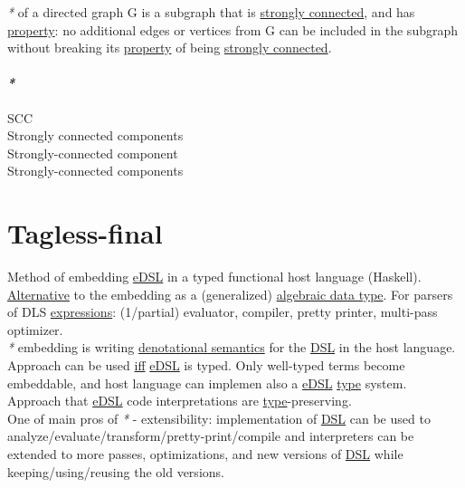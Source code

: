 \documentclass[a4paper,14pt,oneside]{book}
\begin{document}
{\emph{*} of a directed graph G is a subgraph that is \hyperref[orgb705c55]{strongly connected}, and has \hyperref[org2731790]{property}: no additional edges or vertices from G can be included in the subgraph without breaking its \hyperref[org2731790]{property} of being \hyperref[orgb705c55]{strongly connected}.\\

\subsubsection{\emph{*}}
\label{sec:org981028e}

\label{org488e326}SCC\\
\label{org6450785}Strongly connected components\\
\label{orgc65c34e}Strongly-connected component\\
\label{org1a762a6}Strongly-connected components\\

\chapter{\label{orgfb6cfdd}Tagless-final}
\label{sec:org8ffef3c}
Method of embedding \hyperref[org355da77]{eDSL} in a typed functional host language (Haskell). \hyperref[org4703b00]{Alternative} to the embedding as a (generalized) \hyperref[org1ceda42]{algebraic data type}. For parsers of DLS \hyperref[org6328353]{expressions}: (1/partial) evaluator, compiler, pretty printer, multi-pass optimizer.\\

\emph{*} embedding is writing \hyperref[org484295a]{denotational semantics} for the \hyperref[org6c3d96a]{DSL} in the host language.\\

Approach can be used \hyperref[org514b01f]{iff} \hyperref[org355da77]{eDSL} is typed. Only well-typed terms become embeddable, and host language can implemen also a \hyperref[org355da77]{eDSL} \hyperref[orga9ca243]{type} system. Approach that \hyperref[org355da77]{eDSL} code interpretations are \hyperref[orga9ca243]{type}-preserving.\\

One of main pros of \emph{*} - extensibility: implementation of \hyperref[org6c3d96a]{DSL} can be used to analyze/evaluate/transform/pretty-print/compile and interpreters can be extended to more passes, optimizations, and new versions of \hyperref[org6c3d96a]{DSL} while keeping/using/reusing the old versions.\\

}
\end{document}
